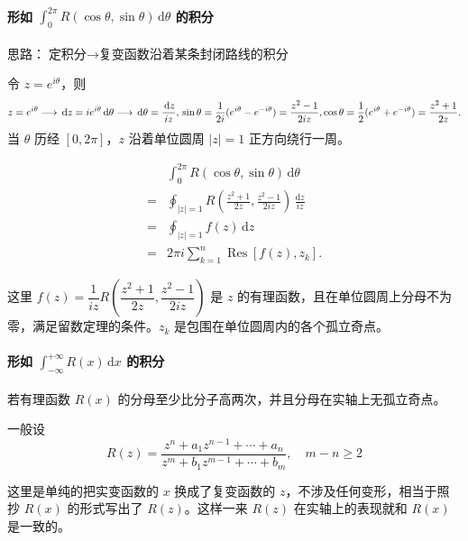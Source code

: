 \paragraph{形如 \(\int_0^{2\pi}R(\cos \theta, \sin \theta)\,\mathrm{d}\theta\) 的积分}
\label{形如-int_02pircos-theta-sin-thetamathrmdtheta-的积分}
思路：\(\boxed{\text{定积分}} \rightarrow \boxed{\text{复变函数沿着某条封闭路线的积分}}\)

令 \(z=e^{i\theta}\)，则 \[
z=e^{i\theta} \longrightarrow \,\mathrm{d}z=ie^{i\theta}\,\mathrm{d}\theta \longrightarrow \,\mathrm{d}\theta=\frac{\,\mathrm{d}z}{iz},\\
\sin \theta = \frac{1}{2i}(e^{i\theta}-e^{-i\theta})=\frac{z^2-1}{2iz},
\\[1.5ex]
\cos \theta = \frac{1}{2}(e^{i\theta}+e^{-i\theta})=\frac{z^2+1}{2z}.
\] 当 \(\theta\) 历经 \([0,2\pi]\)，\(z\) 沿着单位圆周
\(\left|z\right|=1\) 正方向绕行一周。


\begin{align*}
    & \int _{0}^{2\pi} R (\cos\theta, \sin\theta)\,\mathrm{d}\theta\\
    =& \oint _{|z| = 1} R \left( \frac{z^2+1}{2z},\frac{z^2-1}{2iz} \right) \,\frac{\mathrm{d}z}{iz}\\
    =& \oint _{|z| = 1} f(z) \,\mathrm{d}z\\
    =& 2\pi i \sum _{k=1}^{n} \operatorname{Res}[f(z),z_k].
\end{align*}


这里
\(f(z) = \dfrac{1}{iz} R\left( \dfrac{z^2+1}{2z}, \dfrac{z^2-1}{2iz} \right)\)
是 \(z\)
的有理函数，且在单位圆周上分母不为零，满足留数定理的条件。\(z_k\)
是包围在单位圆周内的各个孤立奇点。
\paragraph{形如 \(\int_{-\infty}^{+\infty}R(x)\,\mathrm{d}x\) 的积分}
\label{形如-int_-inftyinftyrxmathrmdx-的积分}
若有理函数 \(R(x)\) 的分母至少比分子高两次，并且分母在实轴上无孤立奇点。

一般设
\[
R(z)=\frac{z^n+a_1z^{n-1}+\cdots+a_n}{z^m+b_1z^{m-1}+\cdots+b_m},\quad m-n \ge 2
\]

\begin{tcolorbox}[title={Info},colback=red!5!white
,colframe=red!75!black
,colbacktitle=yellow!50!red
,coltitle=red!25!black, fonttitle=\bfseries,subtitle style={boxrule=0.4pt, colback=yellow!50!red!25!white}]
这里是单纯的把实变函数的 \(x\) 换成了复变函数的
\(z\)，不涉及任何变形，相当于照抄 \(R(x)\) 的形式写出了
\(R(z)\)。这样一来 \(R(z)\) 在实轴上的表现就和 \(R(x)\) 是一致的。

\end{tcolorbox}

